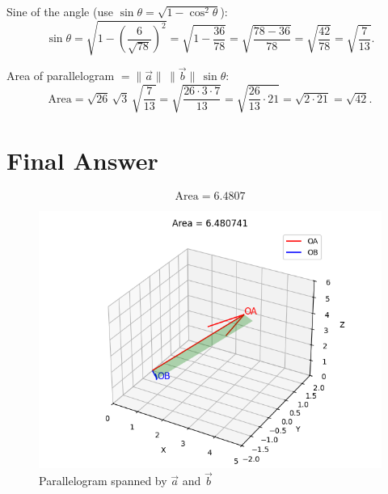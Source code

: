 \documentclass[12pt]{article}
\begin{document}
Sine of the angle (use $ \sin\theta = \sqrt{1-\cos^2\theta}$):
\begin{equation}
\sin\theta = \sqrt{1 - \left(\dfrac{6}{\sqrt{78}}\right)^{\!2}}
= \sqrt{1 - \dfrac{36}{78}}
= \sqrt{\dfrac{78 - 36}{78}}
= \sqrt{\dfrac{42}{78}}
= \sqrt{\dfrac{7}{13}}.
\end{equation}

Area of parallelogram $= \|\Vec{a}\|\,\|\Vec{b}\|\,\sin\theta$:
\begin{equation}
\text{Area} = \sqrt{26}\,\sqrt{3}\,\sqrt{\dfrac{7}{13}}
= \sqrt{ \dfrac{26\cdot 3 \cdot 7}{13} }
= \sqrt{ \dfrac{26}{13}\cdot 21 }
= \sqrt{2 \cdot 21}
= \sqrt{42}.
\end{equation}

\section*{Final Answer}
\begin{equation}
\boxed{\text{Area} = 6.4807}
\end{equation}

\begin{figure}[h!]
    \centering
    \includegraphics[width=0.6\linewidth]{figs/fig.png}
    \caption{Parallelogram spanned by $\Vec{a}$ and $\Vec{b}$ }
\end{figure}
\end{document}
